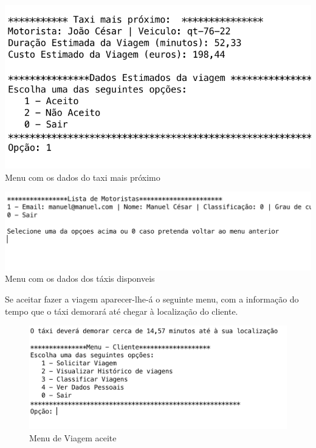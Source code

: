 \noindent\begin{minipage}[b]{.5\textwidth}
	\includegraphics[scale=0.55]{imagem/taxiMaisProx}
	\small{Menu com os dados do taxi mais próximo}
\end{minipage} 
\hfill
\begin{minipage}[b]{.45\textwidth}
	\includegraphics[scale=0.55]{imagem/escolherTaxiEspecifico}
	\small{Menu com os dados dos táxis  disponveis}
\end{minipage}
\hfill

\newpage
Se aceitar fazer a viagem aparecer-lhe-á o seguinte menu, com a informação do tempo que o táxi demorará até chegar à localização do cliente. 

\begin{figure}[htpb]
	\centering
	\includegraphics[scale=0.6]{imagem/aceitarViagem}
	\caption{Menu de Viagem aceite }
	\label{p3:fig:p3_aceitarViagem}
\end{figure}

